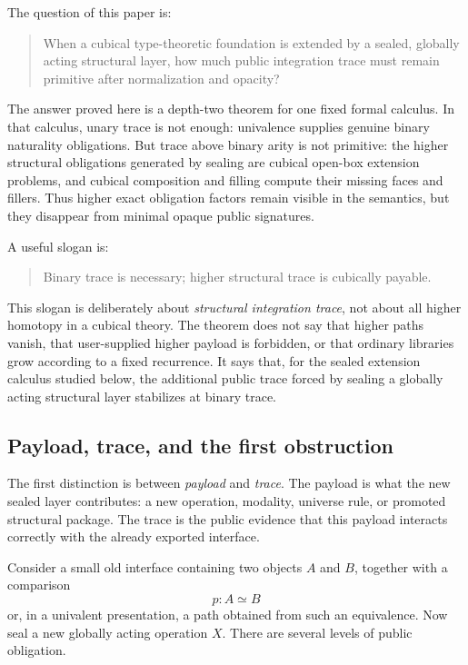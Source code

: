 \documentclass{lmcs}
\begin{document}
The question of this paper is:
\begin{quote}
When a cubical type-theoretic foundation is extended by a sealed, globally acting
structural layer, how much public integration trace must remain primitive after
normalization and opacity?
\end{quote}

The answer proved here is a depth-two theorem for one fixed formal calculus.  In
that calculus, unary trace is not enough: univalence supplies genuine binary
naturality obligations.  But trace above binary arity is not primitive: the
higher structural obligations generated by sealing are cubical open-box extension
problems, and cubical composition and filling compute their missing faces and
fillers.  Thus higher exact obligation factors remain visible in the semantics,
but they disappear from minimal opaque public signatures.

A useful slogan is:
\begin{quote}
Binary trace is necessary; higher structural trace is cubically payable.
\end{quote}

This slogan is deliberately about \emph{structural integration trace}, not about
all higher homotopy in a cubical theory.  The theorem does not say that higher
paths vanish, that user-supplied higher payload is forbidden, or that ordinary
libraries grow according to a fixed recurrence.  It says that, for the sealed
extension calculus studied below, the additional public trace forced by sealing a
globally acting structural layer stabilizes at binary trace.

\subsection{Payload, trace, and the first obstruction}

The first distinction is between \emph{payload} and \emph{trace}.  The payload is
what the new sealed layer contributes: a new operation, modality, universe rule,
or promoted structural package.  The trace is the public evidence that this
payload interacts correctly with the already exported interface.

Consider a small old interface containing two objects \(A\) and \(B\), together
with a comparison
\[
  p : A \simeq B
\]
or, in a univalent presentation, a path obtained from such an equivalence.  Now
seal a new globally acting operation \(X\).  There are several levels of public
obligation.
\end{document}
